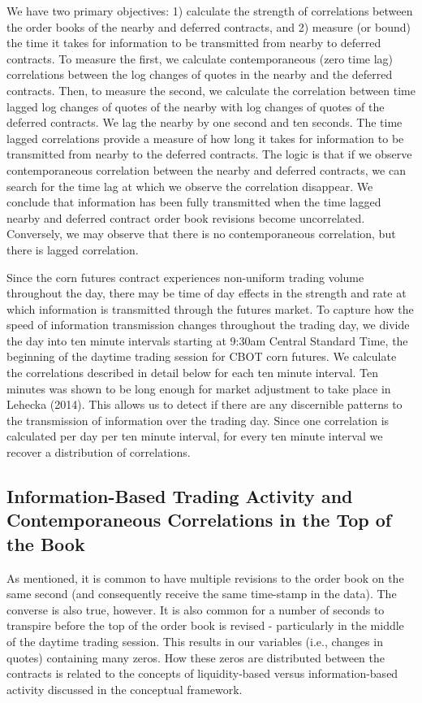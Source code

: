 \documentclass[review,12pt]{elsarticle}
\begin{document}
We have two primary objectives: 1) calculate the strength of
correlations between the order books of the nearby and deferred
contracts, and 2) measure (or bound) the time it takes for information
to be transmitted from nearby to deferred contracts. To measure the
first, we calculate contemporaneous (zero time lag) correlations between
the log changes of quotes in the nearby and the deferred contracts.
Then, to measure the second, we calculate the correlation between time
lagged log changes of quotes of the nearby with log changes of quotes of
the deferred contracts. We lag the nearby by one second and ten seconds.
The time lagged correlations provide a measure of how long it takes for
information to be transmitted from nearby to the deferred contracts. The
logic is that if we observe contemporaneous correlation between the
nearby and deferred contracts, we can search for the time lag at which
we observe the correlation disappear. We conclude that information has
been fully transmitted when the time lagged nearby and deferred contract
order book revisions become uncorrelated. Conversely, we may observe
that there is no contemporaneous correlation, but there is lagged
correlation.

Since the corn futures contract experiences non-uniform trading volume
throughout the day, there may be time of day effects in the strength and
rate at which information is transmitted through the futures market. To
capture how the speed of information transmission changes throughout the
trading day, we divide the day into ten minute intervals starting at
9:30am Central Standard Time, the beginning of the daytime trading
session for CBOT corn futures. We calculate the correlations described
in detail below for each ten minute interval. Ten minutes was shown to
be long enough for market adjustment to take place in Lehecka (2014).
This allows us to detect if there are any discernible patterns to the
transmission of information over the trading day. Since one correlation
is calculated per day per ten minute interval, for every ten minute
interval we recover a distribution of correlations.

\subsection{Information-Based Trading Activity and Contemporaneous
Correlations in the Top of the
Book}\label{information-based-trading-activity-and-contemporaneous-correlations-in-the-top-of-the-book}

As mentioned, it is common to have multiple revisions to the order book
on the same second (and consequently receive the same time-stamp in the
data). The converse is also true, however. It is also common for a
number of seconds to transpire before the top of the order book is
revised - particularly in the middle of the daytime trading session.
This results in our variables (i.e., changes in quotes) containing many
zeros. How these zeros are distributed between the contracts is related
to the concepts of liquidity-based versus information-based activity
discussed in the conceptual framework.
\end{document}
